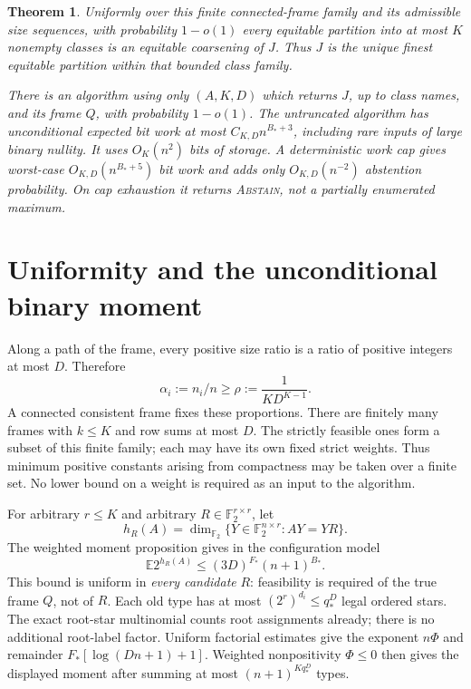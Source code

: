 \documentclass[11pt]{article}
\newtheorem{theorem}{Theorem}
\newcommand{\E}{\mathbb E}
\newcommand{\F}{\mathbb F}
\begin{document}
\begin{theorem}\label{thm:main}
Uniformly over this finite connected-frame family and its admissible
size sequences, with probability $1-o(1)$ every equitable partition
into at most $K$ nonempty classes is an equitable coarsening of $J$.
Thus $J$ is the unique finest equitable partition within that bounded
class family.

There is an algorithm using only $(A,K,D)$ which returns $J$, up to
class names, and its frame $Q$, with probability $1-o(1)$.
The untruncated algorithm has unconditional expected bit work at most
$C_{K,D}n^{B_*+3}$, including rare inputs of large binary nullity.
It uses $O_K(n^2)$ bits of storage. A deterministic work cap gives
worst-case $O_{K,D}(n^{B_*+5})$ bit work and adds only
$O_{K,D}(n^{-2})$ abstention probability. On cap exhaustion it returns
\textnormal{\textsc{Abstain}}, not a partially enumerated maximum.
\end{theorem}

\section{Uniformity and the unconditional binary moment}
Along a path of the frame, every positive size ratio is a ratio of
positive integers at most $D$. Therefore
\[
 \alpha_i:=n_i/n\ge\rho:=\frac1{KD^{K-1}}.
\]
A connected consistent frame fixes these proportions. There are
finitely many frames with $k\le K$ and row sums at most $D$.
The strictly feasible ones form a subset of this finite family; each
may have its own fixed strict weights. Thus minimum positive constants
arising from compactness may be taken over a finite set. No lower bound
on a weight is required as an input to the algorithm.

For arbitrary $r\le K$ and arbitrary $R\in\F_2^{r\times r}$, let
\[
 h_R(A)=\dim_{\F_2}\{Y\in\F_2^{n\times r}:AY=YR\}.
\]
The weighted moment proposition gives in the configuration model
\[
 \E 2^{h_R(A)}\le(3D)^{F_*}(n+1)^{B_*}.
\]
This bound is uniform in \emph{every candidate} $R$: feasibility is
required of the true frame $Q$, not of $R$.
Each old type has at most $(2^r)^{d_i}\le q_*^D$ legal ordered stars.
The exact root-star multinomial counts root assignments already; there
is no additional root-label factor. Uniform factorial estimates give
the exponent $n\Phi$ and remainder $F_*[\log(Dn+1)+1]$. Weighted
nonpositivity $\Phi\le0$ then gives the displayed moment after summing
at most $(n+1)^{Kq_*^D}$ types.
\end{document}
